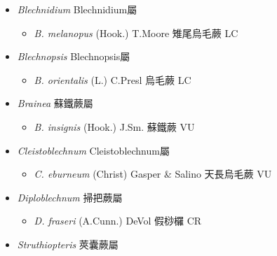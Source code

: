 
  \begin{itemize}
 \item[] \textit{Blechnidium} Blechnidium屬
                                
  \begin{itemize}
        \item[] \textit{B. melanopus} (Hook.) T.Moore  雉尾烏毛蕨   LC
  \end{itemize}
 \item[] \textit{Blechnopsis} Blechnopsis屬
                                
  \begin{itemize}
        \item[] \textit{B. orientalis} (L.) C.Presl  烏毛蕨   LC
  \end{itemize}
 \item[] \textit{Brainea} 蘇鐵蕨屬
                                
  \begin{itemize}
        \item[] \textit{B. insignis} (Hook.) J.Sm.  蘇鐵蕨   VU
  \end{itemize}
 \item[] \textit{Cleistoblechnum} Cleistoblechnum屬
                                
  \begin{itemize}
        \item[] \textit{C. eburneum} (Christ) Gasper \& Salino  天長烏毛蕨   VU
  \end{itemize}
 \item[] \textit{Diploblechnum} 掃把蕨屬
                                
  \begin{itemize}
        \item[] \textit{D. fraseri} (A.Cunn.) DeVol  假桫欏   CR
  \end{itemize}
 \item[] \textit{Struthiopteris} 莢囊蕨屬
                                

\end{itemize}
